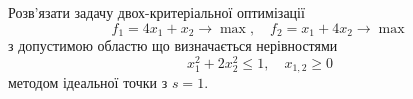


    

\begin{problem}
    Розв'язати задачу двох-критеріальної оптимізації \[ f_1 = 4 x_1 + x_2 \to \max, \quad f_2 = x_1 + 4 x_2 \to \max \] з допустимою областю що визначається нерівностями \[ x_1^2 + 2 x_2^2 \le 1, \quad x_{1, 2} \ge 0 \] методом ідеальної точки з $s = 1$.
\end{problem}

